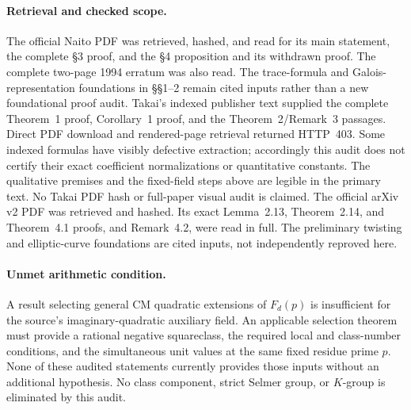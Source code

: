 \paragraph{Retrieval and checked scope.}
The official Naito PDF was retrieved, hashed, and read for its main
statement, the complete \S3 proof, and the \S4 proposition and its
withdrawn proof.  The complete two-page 1994 erratum was also read.
The trace-formula and Galois-representation foundations in \S\S1--2
remain cited inputs rather than a new foundational proof audit.
Takai's indexed publisher text supplied the complete Theorem~1 proof,
Corollary~1 proof, and the Theorem~2/Remark~3 passages.  Direct PDF
download and rendered-page retrieval returned HTTP~403.  Some indexed
formulas have visibly defective extraction; accordingly this audit
does not certify their exact coefficient normalizations or quantitative
constants.  The qualitative premises and the fixed-field steps above
are legible in the primary text.  No Takai PDF hash or full-paper
visual audit is claimed.
The official arXiv v2 PDF was retrieved and hashed.  Its exact
Lemma~2.13, Theorem~2.14, and Theorem~4.1 proofs, and Remark~4.2,
were read in full.  The preliminary twisting and elliptic-curve
foundations are cited inputs, not independently reproved here.

\paragraph{Unmet arithmetic condition.}
A result selecting general CM quadratic extensions of $F_d(p)$ is
insufficient for the source's imaginary-quadratic auxiliary field.
An applicable selection theorem must provide a rational negative
squareclass, the required local and class-number conditions, and the
simultaneous unit values at the same fixed residue prime $p$.
None of these audited statements currently provides those inputs without
an additional hypothesis.  No class component, strict Selmer group,
or $K$-group is eliminated by this audit.
